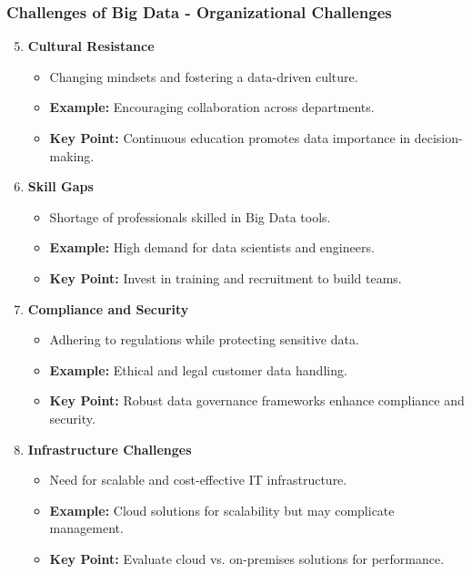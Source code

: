 \documentclass[aspectratio=169]{beamer}
\begin{document}
\begin{frame}[fragile]
    \frametitle{Challenges of Big Data - Organizational Challenges}
    \begin{enumerate}
        \setcounter{enumi}{4}
        \item \textbf{Cultural Resistance}
        \begin{itemize}
            \item Changing mindsets and fostering a data-driven culture.
            \item \textbf{Example:} Encouraging collaboration across departments.
            \item \textbf{Key Point:} Continuous education promotes data importance in decision-making.
        \end{itemize}

        \item \textbf{Skill Gaps}
        \begin{itemize}
            \item Shortage of professionals skilled in Big Data tools.
            \item \textbf{Example:} High demand for data scientists and engineers.
            \item \textbf{Key Point:} Invest in training and recruitment to build teams.
        \end{itemize}

        \item \textbf{Compliance and Security}
        \begin{itemize}
            \item Adhering to regulations while protecting sensitive data.
            \item \textbf{Example:} Ethical and legal customer data handling.
            \item \textbf{Key Point:} Robust data governance frameworks enhance compliance and security.
        \end{itemize}
        
        \item \textbf{Infrastructure Challenges}
        \begin{itemize}
            \item Need for scalable and cost-effective IT infrastructure.
            \item \textbf{Example:} Cloud solutions for scalability but may complicate management.
            \item \textbf{Key Point:} Evaluate cloud vs. on-premises solutions for performance.
        \end{itemize}
    \end{enumerate}
\end{frame}
\end{document}
